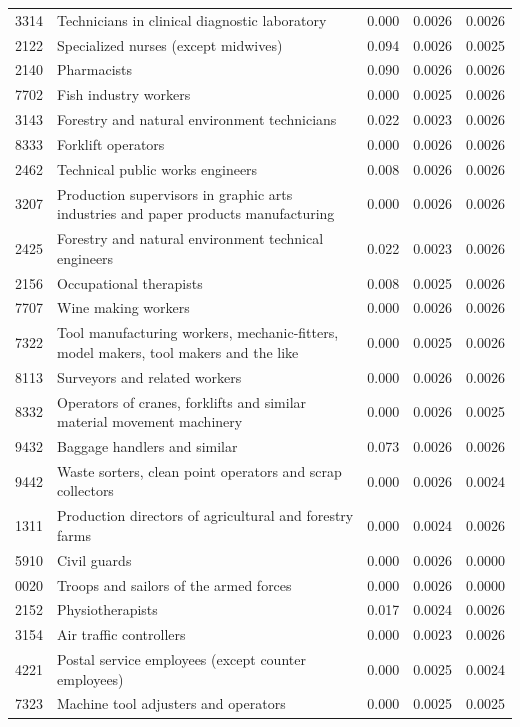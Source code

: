 \begin{longtable}{p{}>{\raggedright\arraybackslash}p{}rrr}
3314 & Technicians in clinical diagnostic laboratory & 0.000 & 0.0026 & 0.0026 \\
2122 & Specialized nurses (except midwives) & 0.094 & 0.0026 & 0.0025 \\
2140 & Pharmacists & 0.090 & 0.0026 & 0.0026 \\
7702 & Fish industry workers & 0.000 & 0.0025 & 0.0026 \\
3143 & Forestry and natural environment technicians & 0.022 & 0.0023 & 0.0026 \\
8333 & Forklift operators & 0.000 & 0.0026 & 0.0026 \\
2462 & Technical public works engineers & 0.008 & 0.0026 & 0.0026 \\
3207 & Production supervisors in graphic arts industries and paper products manufacturing & 0.000 & 0.0026 & 0.0026 \\
2425 & Forestry and natural environment technical engineers & 0.022 & 0.0023 & 0.0026 \\
2156 & Occupational therapists & 0.008 & 0.0025 & 0.0026 \\
7707 & Wine making workers & 0.000 & 0.0026 & 0.0026 \\
7322 & Tool manufacturing workers, mechanic-fitters, model makers, tool makers and the like & 0.000 & 0.0025 & 0.0026 \\
8113 & Surveyors and related workers & 0.000 & 0.0026 & 0.0026 \\
8332 & Operators of cranes, forklifts and similar material movement machinery & 0.000 & 0.0026 & 0.0025 \\
9432 & Baggage handlers and similar & 0.073 & 0.0026 & 0.0026 \\
9442 & Waste sorters, clean point operators and scrap collectors & 0.000 & 0.0026 & 0.0024 \\
1311 & Production directors of agricultural and forestry farms & 0.000 & 0.0024 & 0.0026 \\
5910 & Civil guards & 0.000 & 0.0026 & 0.0000 \\
0020 & Troops and sailors of the armed forces & 0.000 & 0.0026 & 0.0000 \\
2152 & Physiotherapists & 0.017 & 0.0024 & 0.0026 \\
3154 & Air traffic controllers & 0.000 & 0.0023 & 0.0026 \\
4221 & Postal service employees (except counter employees) & 0.000 & 0.0025 & 0.0024 \\
7323 & Machine tool adjusters and operators & 0.000 & 0.0025 & 0.0025 \\

\end{longtable}
